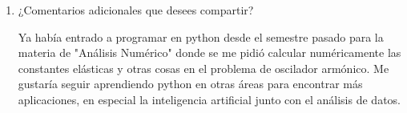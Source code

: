 \documentclass{article}
\begin{document}
\begin{enumerate}
    \item ¿Comentarios adicionales que desees compartir?
    
    Ya había entrado a programar en python desde el semestre pasado para la materia de "Análisis Numérico" donde se me pidió calcular numéricamente las constantes elásticas y otras cosas en el problema de oscilador armónico. Me gustaría seguir aprendiendo python en otras áreas para encontrar más aplicaciones, en especial la inteligencia artificial junto con el análisis de datos. 
\end{enumerate}



 
 
 
\end{document}
